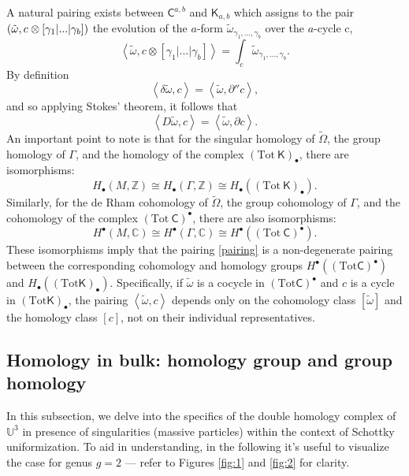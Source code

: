 \documentclass[a4paper,11pt]{article}
\newcommand{\stks}[1]{
	 \left< #1 \right>
}
\newcommand{\compfont}[1]{\bm{\mathsf{#1}}}
\begin{document}
A natural pairing exists between $\compfont{C}^{a,b}$ and $\compfont{K}_{a,b}$ which assigns to the pair $(\tilde{\omega},c\hspace{.1mm}\otimes[\gamma_1|...|\gamma_{b}])$ the evolution of the $a$-form $\tilde{\omega}_{\gamma_1,...,\gamma_b}$ over the $a$-cycle c,
\begin{equation}
\stks{\tilde{\omega},c\otimes[\gamma_1|...|\gamma_b]} = \int_{c} \tilde{\omega}_{\gamma_1,...,\gamma_b}.\label{pairing}
\end{equation}
By definition 
\begin{equation}
\stks{\delta\tilde\omega,c}=\stks{\tilde\omega,\partial'' c},
\end{equation}
and so applying Stokes' theorem, it follows that \begin{equation}
\stks{D\tilde\omega,c}=\stks{\tilde\omega,\partial c}.\label{Dpartial}
\end{equation}
An important point to note is that for the singular homology of $\tilde{\Omega}$, the group homology of $\Gamma$, and the homology of the complex $(\text{Tot}~\compfont{K})_\bullet$, there are isomorphisms:
\begin{equation}
H_{\bullet}(M,\mathbb{Z}) \cong H_{\bullet}(\Gamma,\mathbb{Z})\cong H_{\bullet}((\text{Tot}~\compfont{K})_\bullet).
\end{equation}
Similarly, for the de Rham cohomology of $\tilde{\Omega}$, the group cohomology of $\Gamma$, and the cohomology of the complex $(\text{Tot}~\compfont{C})^\bullet$, there are also isomorphisms:
\begin{equation}
H^{\bullet}(M,\mathbb{C}) \cong H^{\bullet}(\Gamma,\mathbb{C}) \cong H^{\bullet}((\text{Tot}~\compfont{C})^\bullet).
\end{equation}
These isomorphisms imply that the pairing \eqref{pairing} is a non-degenerate pairing between the corresponding cohomology and homology groups $H^{\bullet}((\text{Tot}\compfont{C})^\bullet)$ and $H_{\bullet}((\text{Tot}\compfont{K})_\bullet)$. Specifically, if $\tilde\omega$ is a cocycle in $(\text{Tot}\compfont{C})^{\bullet}$ and $c$ is a cycle in $(\text{Tot}\compfont{K})_\bullet$, the pairing $\stks{\tilde\omega,c}$ depends only on the cohomology class $[\tilde\omega]$ and the homology class $[c]$, not on their individual representatives. 
\subsection{Homology in bulk: homology group and group homology}\label{homology}
In this subsection, we delve into the specifics of the  double homology complex of $\mathbb{U}^3$ in presence of singularities (massive particles) within the context of Schottky uniformization. To aid in understanding, in the following it's useful to visualize the case for genus  $g=2$ --- refer to Figures \ref{fig:1} and \ref{fig:2} for clarity.
\end{document}
